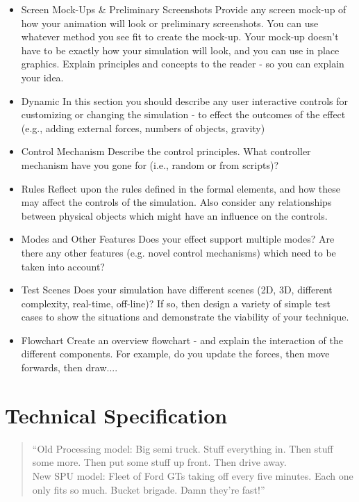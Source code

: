 \documentclass[conference]{acmsiggraph}
\begin{document}
\begin{itemize}
\item {Screen Mock-Ups \& Preliminary Screenshots}
Provide any screen mock-up of how your animation will look or preliminary screenshots.  You can use whatever method you see fit to create the mock-up.  Your mock-up doesn't have to be exactly how your simulation will look, and you can use in place graphics.  Explain principles and concepts to the reader - so you can explain your idea.
\item {Dynamic}
In this section you should describe any user interactive controls for customizing or changing the simulation - to effect the outcomes of the effect (e.g., adding external forces, numbers of objects, gravity)
\item {Control Mechanism}
Describe the control principles.  What controller mechanism have you gone for (i.e., random or from scripts)?  
\item {Rules}
Reflect upon the rules defined in the formal elements, and how these may affect the controls of the simulation.  Also consider any relationships between physical objects which might have an influence on the controls.
\item {Modes and Other Features}
Does your effect support multiple modes?  Are there any other features (e.g. novel control mechanisms) which need to be taken into account?
\item {Test Scenes}
Does your simulation have different scenes (2D, 3D, different complexity, real-time, off-line)?  If so, then design a variety of simple test cases to show the situations and demonstrate the viability of your technique.
\item {Flowchart}
Create an overview flowchart - and explain the interaction of the different components.  For example, do you update the forces, then move forwards, then draw....
\end{itemize}

\section{Technical Specification}

\begin{quote}
``Old Processing model: Big semi truck. Stuff everything in. Then stuff some
more. Then put some stuff up front. Then drive
away.\\
New SPU model: Fleet of Ford GTs taking off every five minutes.
Each one only fits so much. Bucket brigade. Damn they're fast!''
 \cite{spuspeed}
\end{quote}
\end{document}
